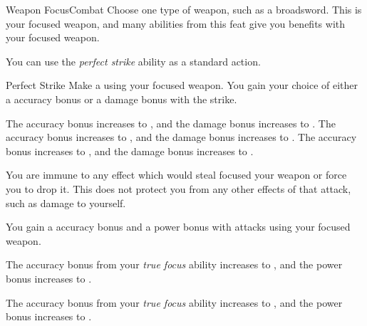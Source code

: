     \begin{feat}{Weapon Focus}{Combat}
         Choose one type of weapon, such as a broadsword.
        This is your focused weapon, and many abilities from this feat give you benefits with your focused weapon.

         You can use the \textit{perfect strike} ability as a standard action.
        \begin{activeability}{Perfect Strike}
            \rankline
            Make a  using your focused weapon.
            You gain your choice of either a  accuracy bonus or a  damage bonus with the strike.

            \rankline
             The accuracy bonus increases to , and the damage bonus increases to .
             The accuracy bonus increases to , and the damage bonus increases to .
             The accuracy bonus increases to , and the damage bonus increases to .
        \end{activeability}

         You are immune to any effect which would steal focused your weapon or force you to drop it.
        This does not protect you from any other effects of that attack, such as damage to yourself.

         You gain a  accuracy bonus and a  power bonus with attacks using your focused weapon.

         The accuracy bonus from your \textit{true focus} ability increases to , and the power bonus increases to .

         The accuracy bonus from your \textit{true focus} ability increases to , and the power bonus increases to .
    \end{feat}

